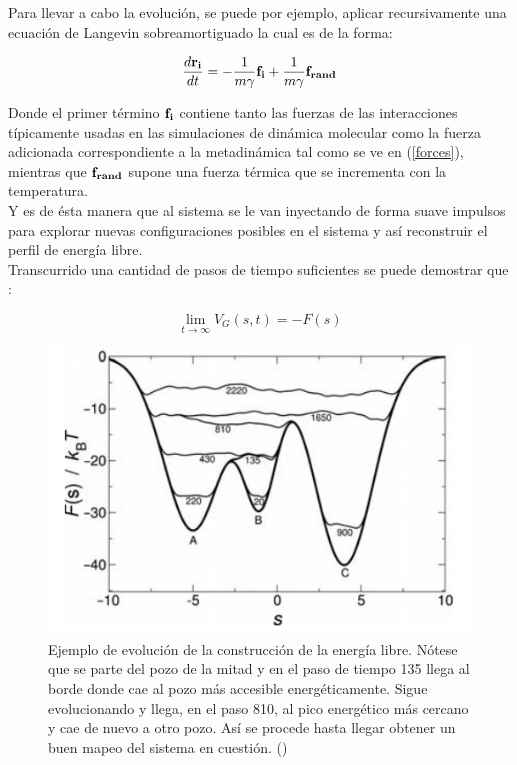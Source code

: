 \documentclass [11pt]{article}
\begin{document}
Para llevar a cabo la evolución, se puede por ejemplo, aplicar recursivamente una ecuación de Langevin sobreamortiguado  \cite{zukerman} la cual es de la forma:

\begin{equation}
    \frac{d{\bf r_i}}{dt}=-\frac{1}{m\gamma}{\bf f_i}+\frac{1}{m\gamma}{\bf f_{rand}}
\end{equation}

Donde el primer término ${\bf f_i}$ contiene tanto las fuerzas de las interacciones típicamente usadas en las simulaciones de dinámica molecular como la fuerza adicionada correspondiente a la metadinámica tal como se ve en (\ref{forces}), mientras que ${\bf f_{rand}}$ supone una fuerza térmica que se incrementa con la temperatura.\\

Y es de ésta manera que al sistema se le van inyectando de forma suave impulsos para explorar nuevas configuraciones posibles en el sistema y así reconstruir el perfil de energía libre.\\

Transcurrido una cantidad de pasos de tiempo suficientes se puede demostrar que \cite{PRL_Bussi}:

\begin{equation}
     \lim_{t\to\infty}V_G(s,t)=-F(s)
\end{equation}



\begin{figure}[t]
\centering
\includegraphics[width=0.7\linewidth]{evolution}
\caption{Ejemplo de evolución de la construcción de la energía libre. Nótese que se parte del pozo de la mitad y en el paso de tiempo 135 llega al borde donde cae al pozo más accesible energéticamente. Sigue evolucionando y llega, en el paso 810, al pico energético más cercano y cae de nuevo a otro pozo. Así se procede hasta llegar obtener un buen mapeo del sistema en cuestión. ({\color{red}\cite{barducci}})}
\label{ejemplo_muestreo}
\end{figure}
\end{document}
